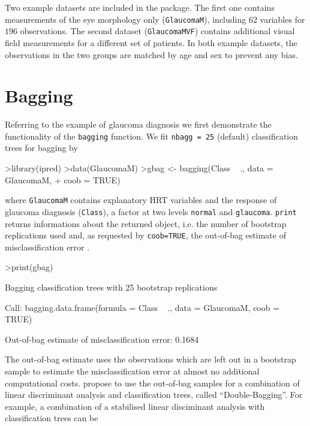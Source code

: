 \documentclass[11pt]{article}
\begin{document}
Two example datasets are included in the package. The first one contains
measurements of the eye morphology only (\texttt{GlaucomaM}), including $62$
variables for $196$ observations. The second dataset (\texttt{GlaucomaMVF})
contains additional visual field measurements for a different set of
patients. In both example datasets, the observations in the two groups are
matched by age and sex to prevent any bias.

\section{Bagging}
Referring to the example of glaucoma diagnosis we first 
demonstrate the functionality of the \texttt{bagging} function. 
We fit \texttt{nbagg = 25} (default) classification trees for bagging by 
\begin{Schunk}
\begin{Sinput}
>library(ipred)
>data(GlaucomaM)
>gbag <- bagging(Class ~ ., data = GlaucomaM, 
+     coob = TRUE)
\end{Sinput}
\end{Schunk}
where \texttt{GlaucomaM} contains explanatory HRT variables 
and the response of glaucoma diagnosis (\texttt{Class}), 
a factor at two levels \texttt{normal} and \texttt{glaucoma}.
\texttt{print} returns informations about the returned object,
i.e. the number of bootstrap replications used and, as requested by
\texttt{coob=TRUE}, the out-of-bag estimate of misclassification error 
\citep{out-of-bag:1996}. 
\begin{Schunk}
\begin{Sinput}
>print(gbag)
\end{Sinput}
\begin{Soutput}
Bagging classification trees with 25 bootstrap replications 

Call: bagging.data.frame(formula = Class ~ ., data = GlaucomaM, coob = TRUE)

Out-of-bag estimate of misclassification error:  0.1684 
\end{Soutput}
\end{Schunk}
The out-of-bag estimate uses the observations which are left out in a
bootstrap sample to estimate the misclassification error at almost no
additional computational costs. 
\cite{double-bag:2002} propose to use the
out-of-bag samples for a combination of linear discriminant analysis and
classification trees, called ``Double-Bagging''. For example, a combination
of a stabilised linear disciminant analysis with classification trees can be
\end{document}
